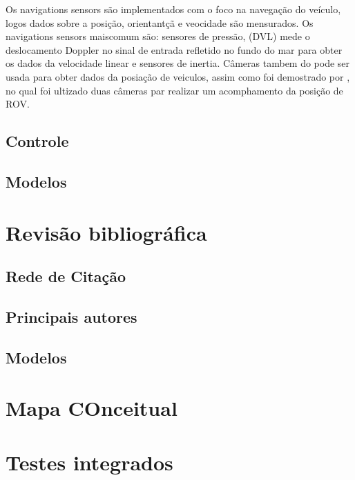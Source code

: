 Os navigations sensors são implementados com o foco na navegação do veículo, logos dados sobre a posição, orientantçã e veocidade são mensurados. Os navigations sensors maiscomum são: sensores de pressão, (DVL) mede o deslocamento Doppler no sinal de entrada refletido no fundo do mar para obter os dados da velocidade linear e sensores de inertia. Câmeras tambem do pode ser usada para obter dados da posiação de veiculos, assim como foi demostrado por \cite{visual_serving}, no qual foi ultizado duas câmeras par realizar um acomphamento da posição de ROV.

\subsection{Controle}
\subsection{Modelos}
\section{Revisão bibliográfica}
\subsection{Rede de Citação}
\subsection{Principais autores}
\subsection{Modelos}
\section{Mapa COnceitual}
\lipsum[1]

\section{Testes integrados}
\label{sec:testi}
\lipsum[1]







